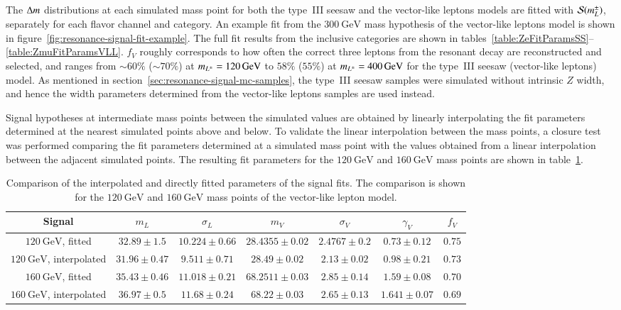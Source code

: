 The $\Delta m$ distributions at each simulated mass point for both the type~III seesaw and the vector-like leptons models are fitted with $\mathcal{S}(m_\lpm)$, separately for each flavor channel and category. An example fit from the $\SI{300}{\giga\electronvolt}$ mass hypothesis of the vector-like leptons model is shown in figure~\ref{fig:resonance-signal-fit-example}. The full fit results from the inclusive categories are shown in tables~\ref{table:ZeFitParamsSS}--\ref{table:ZmuFitParamsVLL}. $f_V$ roughly corresponds to how often the correct three leptons from the resonant decay are reconstructed and selected, and ranges from $\sim60\%$ ($\sim70\%$) at $m_{L^{\pm}}=\SI{120}{\giga\electronvolt}$ to $58\%$ ($55\%$) at $m_{L^{\pm}}=\SI{400}{\giga\electronvolt}$ for the type~III seesaw (vector-like leptons) model. As mentioned in section~\ref{sec:resonance-signal-mc-samples}, the type~III seesaw samples were simulated without intrinsic $Z$ width, and hence the width parameters determined from the vector-like leptons samples are used instead. 

Signal hypotheses at intermediate mass points between the simulated values are obtained by linearly interpolating the fit parameters determined at the nearest simulated points above and below. To validate the linear interpolation between the mass points, a closure test was performed comparing the fit parameters determined at a simulated mass point with the values obtained from a linear interpolation between the adjacent simulated points. The resulting fit parameters for the $\SI{120}{\giga\electronvolt}$ and $\SI{160}{\giga\electronvolt}$ mass points are shown in table~\ref{table:resonance-interpolation-validation}. 

\begin{table}[htbp]
	\footnotesize
	\centering
	\begin{tabular}{|c|c|c|c|c|c|c|}
		\hline
		Signal & $m_L$ & $\sigma_L$ &  $m_V$ & $\sigma_V$ & $\gamma_V$ & $f_V$  \\ 
		\hline
		$\SI{120}{\giga\electronvolt}$, fitted    & $ 32.89 \pm 1.5 $ &$10.224 \pm 0.66$&$28.4355 \pm 0.02$&$2.4767 \pm 0.2$&$0.73 \pm 0.12$&$0.75$ \\
		$\SI{120}{\giga\electronvolt}$, interpolated   & $31.96 \pm 0.47$ &$9.511  \pm 0.71 $&$28.49 \pm 0.02$    & $2.13 \pm 0.02$&$ 0.98 \pm 0.21$&$0.73$ \\ 
		\hline
		$\SI{160}{\giga\electronvolt}$, fitted    &$35.43  \pm 0.46$ &$11.018 \pm 0.21$&$68.2511 \pm 0.03$&$2.85 \pm 0.14$&$1.59     \pm 0.08$&$ 0.70$ \\
		$\SI{160}{\giga\electronvolt}$, interpolated  & $36.97  \pm 0.5$  & $11.68 \pm 0.24$ &$68.22 \pm 0.03$     &$2.65 \pm0.13$&$1.641  \pm 0.07$&$0.69$  \\ 
		\hline
	\end{tabular}
	\caption{Comparison of the interpolated and directly fitted parameters of the signal fits. The comparison is shown for the $\SI{120}{\giga\electronvolt}$ and $\SI{160}{\giga\electronvolt}$ mass points of the vector-like lepton model.}
	\label{table:resonance-interpolation-validation}
\end{table}



